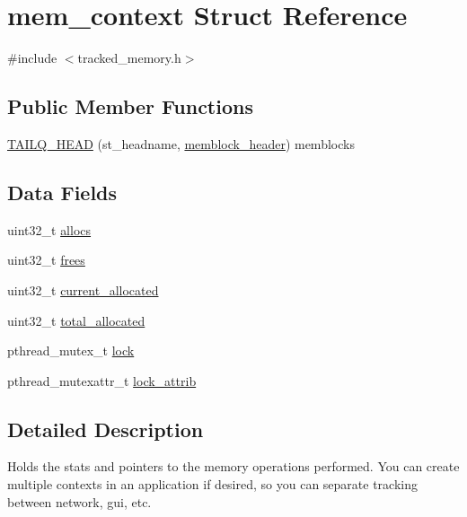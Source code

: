 \section{mem\-\_\-context Struct Reference}
\label{structmem__context}


{\ttfamily \#include $<$tracked\-\_\-memory.\-h$>$}

\subsection*{Public Member Functions}
\begin{DoxyCompactItemize}
\item 
\hyperlink{structmem__context_a34706a5868f46210cd53dac06b3d1faa}{T\-A\-I\-L\-Q\-\_\-\-H\-E\-A\-D} (st\-\_\-headname, \hyperlink{structmemblock__header}{memblock\-\_\-header}) memblocks
\end{DoxyCompactItemize}
\subsection*{Data Fields}
\begin{DoxyCompactItemize}
\item 
uint32\-\_\-t \hyperlink{structmem__context_a3eb8087c0f859202f13e8877f1871530}{allocs}
\item 
uint32\-\_\-t \hyperlink{structmem__context_a816e6dda100a2b8133c078194cd41f11}{frees}
\item 
uint32\-\_\-t \hyperlink{structmem__context_a8edd1cdf2fb7f8e841eb7abacb839a18}{current\-\_\-allocated}
\item 
uint32\-\_\-t \hyperlink{structmem__context_a513b900aa111101d2491b1395912e7a1}{total\-\_\-allocated}
\item 
pthread\-\_\-mutex\-\_\-t \hyperlink{structmem__context_a0ab6d63011eb813840718d80623e16c9}{lock}
\item 
pthread\-\_\-mutexattr\-\_\-t \hyperlink{structmem__context_a270a8ee10aed0945ffbbfc1a806794c3}{lock\-\_\-attrib}
\end{DoxyCompactItemize}


\subsection{Detailed Description}
Holds the stats and pointers to the memory operations performed. You can create multiple contexts in an application if desired, so you can separate tracking between network, gui, etc.

